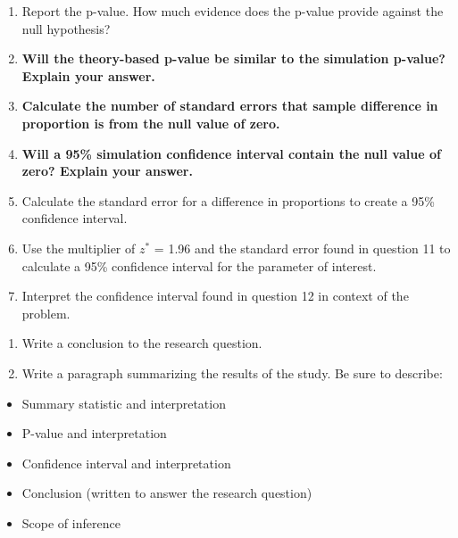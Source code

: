 \documentclass[
]{report}
\begin{document}
\begin{enumerate}
\def\labelenumi{\arabic{enumi}.}
\setcounter{enumi}{6}
\item
  Report the p-value. How much evidence does the p-value provide against the null hypothesis?
  \vspace{0.3in}
\item
  \textbf{Will the theory-based p-value be similar to the simulation p-value? Explain your answer.}
  \vspace{0.8in}
\item
  \textbf{Calculate the number of standard errors that sample difference in proportion is from the null value of zero.}
  \vspace{0.8in}
\item
  \textbf{Will a 95\% simulation confidence interval contain the null value of zero? Explain your answer.}
  \vspace{0.8in}
\item
  Calculate the standard error for a difference in proportions to create a 95\% confidence interval.\\
  \vspace{1in}
\item
  Use the multiplier of \(z^*\) = 1.96 and the standard error found in question 11 to calculate a 95\% confidence interval for the parameter of interest.
  \vspace{1in}
\item
  Interpret the confidence interval found in question 12 in context of the problem.
\end{enumerate}

\vspace{0.8in}

\begin{enumerate}
\def\labelenumi{\arabic{enumi}.}
\setcounter{enumi}{13}
\item
  Write a conclusion to the research question.
  \vspace{0.8in}
\item
  Write a paragraph summarizing the results of the study. Be sure to describe:
\end{enumerate}

\begin{itemize}
\item
  Summary statistic and interpretation
\item
  P-value and interpretation
\item
  Confidence interval and interpretation
\item
  Conclusion (written to answer the research question)
\item
  Scope of inference
\end{itemize}
\end{document}
